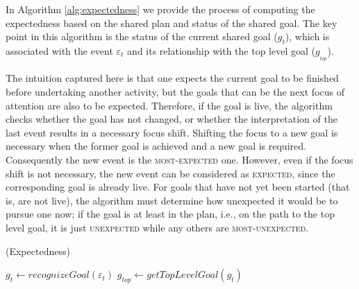\documentclass{aamas2016_extendedabstract}
\begin{document}
In Algorithm \ref{alg:expectedness} we provide the process of computing the
expectedness based on the shared plan and status of the shared goal. The key
point in this algorithm is the status of the current shared goal
($\mathit{g}_{t}$), which is associated with the event $\varepsilon_t$ and its
relationship with the top level goal ($\mathit{g}_{_{top}}$).

The intuition captured here is that one expects the current goal to be finished
before undertaking another activity, but the goals that can be the next focus of
attention are also to be expected. Therefore, if the goal is live, the algorithm
checks whether the goal has not changed, or whether the interpretation of the
last event results in a necessary focus shift. Shifting the focus to a new goal
is necessary when the former goal is achieved and a new goal is required.
Consequently the new event is the \textsc{most-expected} one. However, even if
the focus shift is not necessary, the new event can be considered as
\textsc{expected}, since the corresponding goal is already live. For goals that
have not yet been started (that is, are not live), the algorithm must determine
how unexpected it would be to pursue one now; if the goal is at least in the
plan, i.e., on the path to the top level goal, it is just \textsc{unexpected}
while any others are \textsc{most-unexpected}.

\vspace*{-2mm}
\begin{algorithm}
	\caption{(Expectedness)}
	\label{alg:expectedness}
	\begin{algorithmic}[1]
			\State $\mathit{g}_{t} \gets \textit{recognizeGoal}{(\varepsilon_t)}$
			\State $\mathit{g}_{top} \gets \textit{getTopLevelGoal}{(\mathit{g}_{t})}$
				\State {}
				\Else
					\State {}
				\EndIf
			\Else
					\State {}
				\Else
					\State {}
				\EndIf
			\EndIf
		\EndFunction
	\end{algorithmic}
\end{algorithm}
\end{document}
